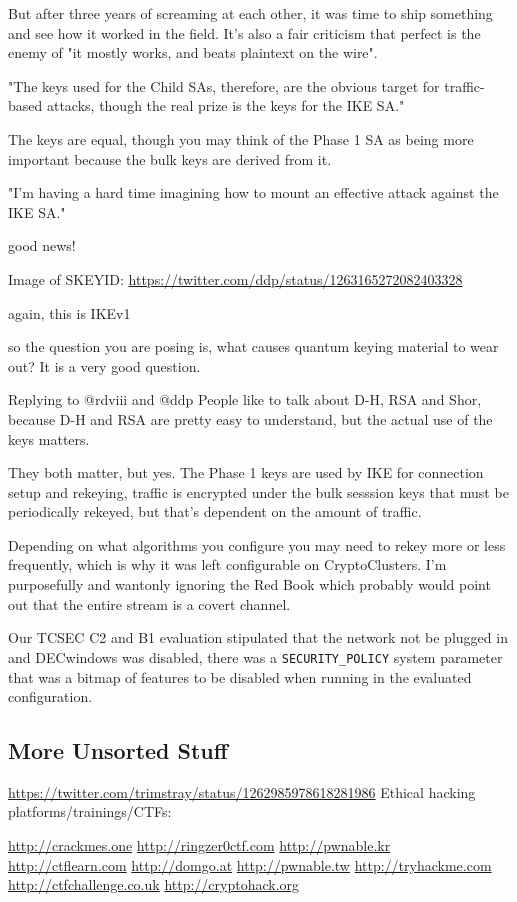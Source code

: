 \documentclass[%
 aip,
 jmp,%
 amsmath,amssymb,
 reprint,%
]{revtex4-1}
\begin{document}
But after three years of screaming at each other, it was time to ship
something and see how it worked in the field.  It's also a fair
criticism that perfect is the enemy of "it mostly works, and beats
plaintext on the wire".

"The keys used for the Child SAs, therefore, are the obvious target for traffic-based attacks, though the real prize is the keys for the IKE SA."

The keys are equal, though you may think of the Phase 1 SA as being
more important because the bulk keys are derived from it.

"I'm having a hard time imagining how to mount an effective attack against the IKE SA."

good news!

Image of SKEYID:
\url{https://twitter.com/ddp/status/1263165272082403328}

again, this is IKEv1

so the question you are posing is, what causes quantum keying material
to wear out?  It is a very good question.

Replying to 
@rdviii
 and 
@ddp
People like to talk about D-H, RSA and Shor, because D-H and RSA are
pretty easy to understand, but the actual use of the keys matters.


They both matter, but yes.  The Phase 1 keys are used by IKE for
connection setup and rekeying, traffic is encrypted under the bulk
sesssion keys that must be periodically rekeyed, but that's dependent
on the amount of traffic.

Depending on what algorithms you configure you may need to rekey more or less frequently, which is why it was left configurable on CryptoClusters.  I'm purposefully and wantonly ignoring the Red Book which probably would point out that the entire stream is a covert channel.

Our TCSEC C2 and B1 evaluation stipulated that the network not be
plugged in and DECwindows was disabled, there was a \verb|SECURITY_POLICY|
system parameter that was a bitmap of features to be disabled when
running in the evaluated configuration.

\subsection{More Unsorted Stuff}

\url{https://twitter.com/trimstray/status/1262985978618281986}
Ethical hacking platforms/trainings/CTFs:

\url{http://crackmes.one}
\url{http://ringzer0ctf.com}
\url{http://pwnable.kr}
\url{http://ctflearn.com}
\url{http://domgo.at}
\url{http://pwnable.tw}
\url{http://tryhackme.com}
\url{http://ctfchallenge.co.uk}
\url{http://cryptohack.org}
\end{document}

